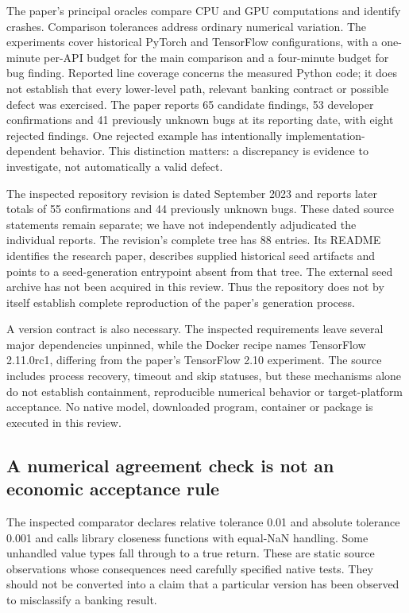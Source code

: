 The paper's principal oracles compare CPU and GPU computations and identify crashes. Comparison tolerances address ordinary numerical variation. The experiments cover historical PyTorch and TensorFlow configurations, with a one-minute per-API budget for the main comparison and a four-minute budget for bug finding. Reported line coverage concerns the measured Python code; it does not establish that every lower-level path, relevant banking contract or possible defect was exercised. The paper reports 65 candidate findings, 53 developer confirmations and 41 previously unknown bugs at its reporting date, with eight rejected findings. One rejected example has intentionally implementation-dependent behavior. This distinction matters: a discrepancy is evidence to investigate, not automatically a valid defect.\citep{exec24_fuzzing_original}

The inspected repository revision is dated September 2023 and reports later totals of 55 confirmations and 44 previously unknown bugs. These dated source statements remain separate; we have not independently adjudicated the individual reports. The revision's complete tree has 88 entries. Its README identifies the research paper, describes supplied historical seed artifacts and points to a seed-generation entrypoint absent from that tree. The external seed archive has not been acquired in this review. Thus the repository does not by itself establish complete reproduction of the paper's generation process.\citep{exec24_titanfuzz_source}

A version contract is also necessary. The inspected requirements leave several major dependencies unpinned, while the Docker recipe names TensorFlow 2.11.0rc1, differing from the paper's TensorFlow 2.10 experiment. The source includes process recovery, timeout and skip statuses, but these mechanisms alone do not establish containment, reproducible numerical behavior or target-platform acceptance. No native model, downloaded program, container or package is executed in this review.\citep{exec24_titanfuzz_source}

\subsection{A numerical agreement check is not an economic acceptance rule}
The inspected comparator declares relative tolerance 0.01 and absolute tolerance 0.001 and calls library closeness functions with equal-NaN handling. Some unhandled value types fall through to a true return. These are static source observations whose consequences need carefully specified native tests. They should not be converted into a claim that a particular version has been observed to misclassify a banking result.\citep{exec24_titanfuzz_source}

